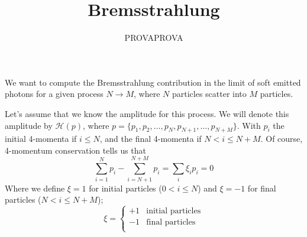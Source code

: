 \documentclass{article}
\title{Bremsstrahlung}
\author{PROVAPROVA}
\begin{document}
\maketitle

We want to compute the Bremsstrahlung contribution
in the limit of soft emitted photons for a given process $N \to M$,
where $N$ particles scatter into $M$ particles.

\begin{center}
\end{center}

Let's assume that we know the amplitude for this process.
We will denote this amplitude by $\mathcal{H}(p)$,
where $p = \{p_1, p_2, \ldots, p_N, p_{N+1}, \ldots, p_{N+M}\}$.
With $p_i$ the initial 4-momenta if $i\leq N$, and the final 4-momenta if $N<i\leq N+M$.
Of course, 4-momentum conservation tells us that
\begin{equation*}
	\sum_{i=1}^{N}p_i - \sum_{i=N+1}^{N+M} p_i
	= \sum_i \xi_i p_i
	= 0
\end{equation*}
Where we define $\xi=1$ for initial particles ($0<i\leq N$)
and $\xi=-1$ for final particles ($N<i\leq N+M$);
\begin{equation*}
    \xi
    = \begin{cases}
        +1 & \text{initial particles}\\
        -1 & \text{final particles}\\
    \end{cases}
\end{equation*}
\end{document}

